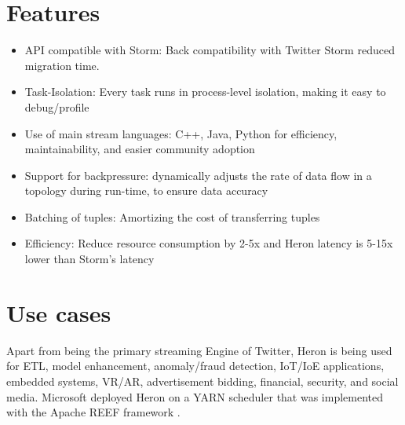 \documentclass[9pt,twocolumn,twoside]{../../styles/osajnl}
\begin{document}
\section{Features}
\begin{itemize}
    \item API compatible with Storm: Back compatibility with Twitter Storm reduced migration time. 
    \item Task-Isolation: Every task runs in process-level isolation, making it easy to debug/profile
    \item Use of main stream languages: C++, Java, Python for efficiency, maintainability, and easier community adoption
    \item Support for backpressure: dynamically adjusts the rate of data flow in a topology during run-time, to ensure data accuracy
    \item Batching of tuples: Amortizing the cost of transferring tuples
    \item Efficiency: Reduce resource consumption by 2-5x and Heron latency is 5-15x lower than Storm’s latency \cite{www-FlyFasterHeron}
\end{itemize}
\section{Use cases}
Apart from being the primary streaming Engine of Twitter, Heron is being used for ETL, model enhancement, anomaly/fraud detection, IoT/IoE applications, embedded systems, VR/AR, advertisement bidding, financial, security, and social media\cite{www-openSourceHeron}. Microsoft deployed Heron on a YARN scheduler that was implemented with the Apache REEF framework \cite{www-HeronYARN}.
\end{document}
